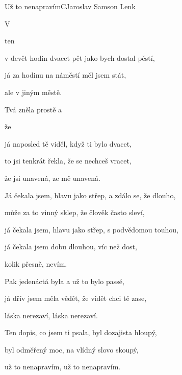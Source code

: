\begin{song}{Už to nenapravím}{C}{Jaroslav Samson Lenk}

\begin{SBChorus}

   

\end{SBChorus}

\begin{SBVerse}

V 

ten 

v devět hodin dvacet pět jako bych dostal pěstí,

já za hodinu na náměstí měl jsem stát,

ale v jiným městě.

Tvá  zněla prostě a 

že 


já naposled tě viděl, když ti bylo dvacet,

to jsi tenkrát řekla, že se nechceš vracet,

že jsi unavená, ze mě unavená.

\end{SBVerse}

\begin{SBVerse}

Já čekala jsem, hlavu jako střep, a zdálo se, že dlouho,

může za to vinný sklep, že člověk často sleví,

já čekala jsem, hlavu jako střep, s podvědomou touhou,

já čekala jsem dobu dlouhou, víc než dost, 

kolik přesně, nevím.

Pak jedenáctá byla a už to bylo passé,

já dřív jsem měla vědět, že vidět chci tě zase,

láska nerezaví, láska nerezaví.

Ten dopis, co jsem ti psala, byl dozajista hloupý,

byl odměřený moc, na vlídný slovo skoupý,

už to nenapravím, už to nenapravím.

\end{SBVerse}
\end{song}

\pagebreak